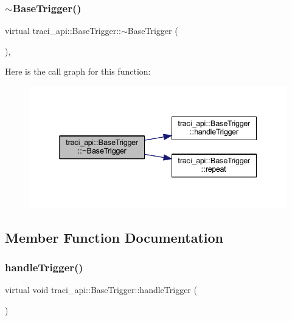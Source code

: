 \subsubsection{\texorpdfstring{$\sim$\+Base\+Trigger()}{~BaseTrigger()}}
{\footnotesize\ttfamily virtual traci\+\_\+api\+::\+Base\+Trigger\+::$\sim$\+Base\+Trigger (\begin{DoxyParamCaption}{ }\end{DoxyParamCaption})\hspace{0.3cm}{\ttfamily [inline]}, {\ttfamily [virtual]}}

Here is the call graph for this function\+:
\nopagebreak
\begin{figure}[H]
\begin{center}
\leavevmode
\includegraphics[width=338pt]{classtraci__api_1_1_base_trigger_ae1e572064f6b16fa1de9e5416b6c1a9c_cgraph}
\end{center}
\end{figure}


\subsection{Member Function Documentation}
\mbox{\label{classtraci__api_1_1_base_trigger_a2de2824fb1d228d4c04aa15c272017a5}} 
\subsubsection{\texorpdfstring{handle\+Trigger()}{handleTrigger()}}
{\footnotesize\ttfamily virtual void traci\+\_\+api\+::\+Base\+Trigger\+::handle\+Trigger (\begin{DoxyParamCaption}{ }\end{DoxyParamCaption})\hspace{0.3cm}{\ttfamily [pure virtual]}}



